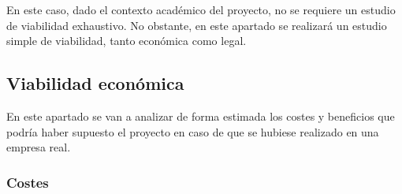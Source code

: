 En este caso, dado el contexto académico del proyecto, no se requiere un estudio de viabilidad exhaustivo. No obstante, en este apartado se realizará un estudio simple de viabilidad, tanto económica como legal.

\subsection{Viabilidad económica}

En este apartado se van a analizar de forma estimada los costes y beneficios que podría haber supuesto el proyecto en caso de que se hubiese realizado en una empresa real.

\subsubsection{Costes}

